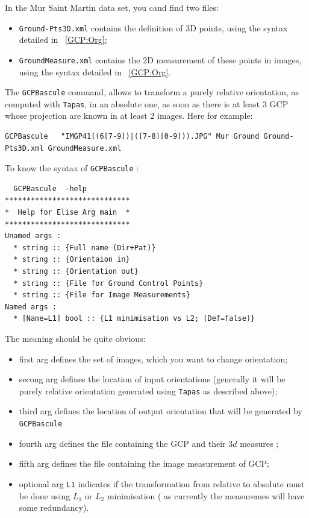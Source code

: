 In the Mur Saint Martin data set, you cand find two files:

\begin{itemize}
  \item {\tt Ground-Pts3D.xml} contains the definition of $3$D points, using
        the syntax detailed in ~\ref{GCP:Org};
  \item {\tt GroundMeasure.xml}  contains the $2$D measurement of these points
        in images, using the syntax detailed in ~\ref{GCP:Org}.
\end{itemize}


The {\tt GCPBascule} command, allows to transform a purely relative orientation,
as computed with {\tt Tapas}, in an absolute one, as soon as there is at least
$3$ GCP whose projection are known in at least $2$  images. Here for example:


\begin{verbatim}
GCPBascule   "IMGP41((6[7-9])|([7-8][0-9])).JPG" Mur Ground Ground-Pts3D.xml GroundMeasure.xml
\end{verbatim}

To know the syntax of {\tt GCPBascule} :
\begin{verbatim}
  GCPBascule  -help
*****************************
*  Help for Elise Arg main  *
*****************************
Unamed args : 
  * string :: {Full name (Dir+Pat)}
  * string :: {Orientaion in}
  * string :: {Orientation out}
  * string :: {File for Ground Control Points}
  * string :: {File for Image Measurements}
Named args : 
  * [Name=L1] bool :: {L1 minimisation vs L2; (Def=false)}
\end{verbatim}


The meaning should be quite obvious:

\begin{itemize}
  \item  first arg defines the set of images, which you want to change orientation;
  \item  secong arg defines the location of input orientations (generally it will be purely relative
         orientation generated using {\tt Tapas} as described above);


  \item  third arg defines the location of output orientation that will be generated by {\tt GCPBascule}

  \item fourth arg defines the file containing the GCP and their $3d$ measures ;
  \item fifth arg defines the file containing the image measurement of GCP;
  \item  optional arg {\tt L1} indicates if the transformation from relative to absolute
         must be done using $L_1$ or $L_2$ minimisation ( as currently the  measuremes 
         will have some redundancy).
\end{itemize}


